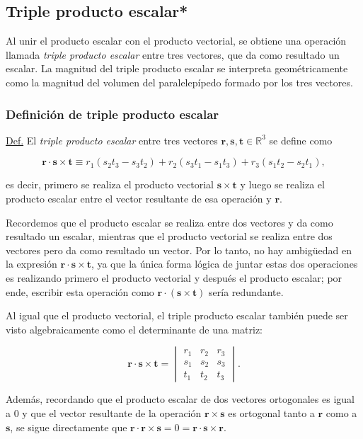 \documentclass[notasLineal]{subfile}
\begin{document}
\subsection*{Triple producto escalar*}

Al unir el producto escalar con el producto vectorial, se obtiene una operación llamada \emph{triple producto escalar} entre tres vectores, que da como resultado un escalar. La magnitud del triple producto escalar se interpreta geométricamente como la magnitud del volumen del paralelepípedo formado por los tres vectores.

\subsubsection{Definición de triple producto escalar}
\begin{tcolorbox}
\underline{Def.} El \emph{triple producto escalar} entre tres vectores $\mathbf{r},\mathbf{s},\mathbf{t}\in\mathbb{R}^3$ se define como

$$\mathbf{r}\cdot\mathbf{s}\times\mathbf{t} \equiv r_1(s_2t_3-s_3t_2) + r_2(s_3t_1-s_1t_3) + r_3(s_1t_2-s_2t_1),$$

\noindent es decir, primero se realiza el producto vectorial $\mathbf{s}\times\mathbf{t}$ y luego se realiza el producto escalar entre el vector resultante de esa operación y $\mathbf{r}$.
\end{tcolorbox}

Recordemos que el producto escalar se realiza entre dos vectores y da como resultado un escalar, mientras que el producto vectorial se realiza entre dos vectores pero da como resultado un vector. Por lo tanto, no hay ambigüedad en la expresión $\mathbf{r}\cdot\mathbf{s}\times\mathbf{t}$, ya que la única forma lógica de juntar estas dos operaciones es realizando primero el producto vectorial y después el producto escalar; por ende, escribir esta operación como $\mathbf{r}\cdot(\mathbf{s}\times\mathbf{t})$ sería redundante.

Al igual que el producto vectorial, el triple producto escalar también puede ser visto algebraicamente como el determinante de una matriz:

$$\mathbf{r}\cdot\mathbf{s}\times\mathbf{t} = \begin{vmatrix} r_1&r_2&r_3 \\ s_1&s_2&s_3 \\ t_1&t_2&t_3 \end{vmatrix}.$$

    Además, recordando que el producto escalar de dos vectores ortogonales es igual a $0$ y que el vector resultante de la operación $\mathbf{r}\times\mathbf{s}$ es ortogonal tanto a $\mathbf{r}$ como a $\mathbf{s}$, se sigue directamente que $\mathbf{r}\cdot\mathbf{r}\times\mathbf{s}=0=\mathbf{r}\cdot\mathbf{s}\times\mathbf{r}$.
\end{document}
